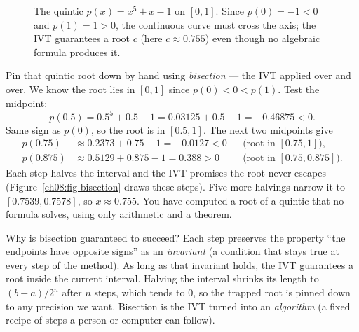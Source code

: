 \begin{figure}[htbp]
\centering
{}
\caption{The quintic $p(x)=x^5+x-1$ on $[0,1]$. Since $p(0)=-1<0$ and $p(1)=1>0$, the
continuous curve must cross the axis; the IVT guarantees a root $c$ (here $c\approx0.755$)
even though no algebraic formula produces it.}
\label{ch08:fig-quintic}
\end{figure}

\begin{labbox}
Pin that quintic root down by hand using \emph{bisection} --- the IVT applied over and
over. We know the root lies in $[0,1]$ since $p(0)<0<p(1)$. Test the midpoint:
\[
  p(0.5)=0.5^5+0.5-1=0.03125+0.5-1=-0.46875<0.
\]
Same sign as $p(0)$, so the root is in $[0.5,1]$. The next two midpoints give
\begin{align*}
  p(0.75)  &\approx 0.2373+0.75-1  = -0.0127<0 && \text{(root in $[0.75,1]$)},\\
  p(0.875) &\approx 0.5129+0.875-1 = 0.388>0   && \text{(root in $[0.75,0.875]$)}.
\end{align*}
Each step halves the interval and the IVT promises the root never escapes
(Figure~\ref{ch08:fig-bisection} draws these steps). Five more halvings narrow it to
$[0.7539,0.7578]$, so $x\approx 0.755$. You have computed a root of a quintic that no
formula solves, using only arithmetic and a theorem.
\end{labbox}

\begin{whybox}
Why is bisection guaranteed to succeed? Each step preserves the property ``the
endpoints have opposite signs'' as an \emph{invariant} (a condition that stays true at
every step of the method). As long as that invariant holds, the IVT guarantees a root
inside the current interval. Halving the interval shrinks its length to $(b-a)/2^n$ after
$n$ steps, which tends to $0$, so the trapped root is pinned down to any precision we
want. Bisection is the IVT turned into an \emph{algorithm} (a fixed recipe of steps a
person or computer can follow).
\end{whybox}

